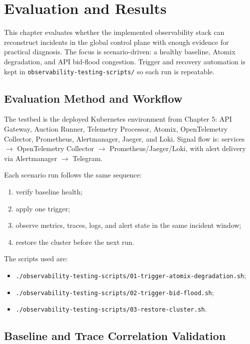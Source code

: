 \section{Evaluation and Results}

This chapter evaluates whether the implemented observability stack can reconstruct incidents in the global control plane with enough evidence for practical diagnosis. The focus is scenario-driven: a healthy baseline, Atomix degradation, and API bid-flood congestion. Trigger and recovery automation is kept in \texttt{observability-testing-scripts/} so each run is repeatable.

\subsection{Evaluation Method and Workflow}

The testbed is the deployed Kubernetes environment from Chapter 5: API Gateway, Auction Runner, Telemetry Processor, Atomix, OpenTelemetry Collector, Prometheus, Alertmanager, Jaeger, and Loki. Signal flow is:
services $\rightarrow$ OpenTelemetry Collector $\rightarrow$ Prometheus/Jaeger/Loki, with alert delivery via Alertmanager $\rightarrow$ Telegram.

Each scenario run follows the same sequence:

\begin{enumerate}
    \item verify baseline health;
    \item apply one trigger;
    \item observe metrics, traces, logs, and alert state in the same incident window;
    \item restore the cluster before the next run.
\end{enumerate}

The scripts used are:

\begin{itemize}
    \item \texttt{./observability-testing-scripts/01-trigger-atomix-degradation.sh};
    \item \texttt{./observability-testing-scripts/02-trigger-bid-flood.sh};
    \item \texttt{./observability-testing-scripts/03-restore-cluster.sh}.
\end{itemize}

\subsection{Baseline and Trace Correlation Validation}

